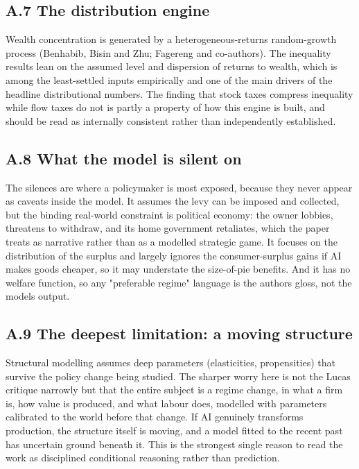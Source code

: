 \documentclass[11pt]{article}
\begin{document}
\hypertarget{a.7-the-distribution-engine}{%
\subsection{A.7 The distribution
engine}\label{a.7-the-distribution-engine}}

Wealth concentration is generated by a heterogeneous-returns
random-growth process (Benhabib, Bisin and Zhu; Fagereng and
co-authors). The inequality results lean on the assumed level and
dispersion of returns to wealth, which is among the least-settled inputs
empirically and one of the main drivers of the headline distributional
numbers. The finding that stock taxes compress inequality while flow
taxes do not is partly a property of how this engine is built, and
should be read as internally consistent rather than independently
established.

\hypertarget{a.8-what-the-model-is-silent-on}{%
\subsection{A.8 What the model is silent
on}\label{a.8-what-the-model-is-silent-on}}

The silences are where a policymaker is most exposed, because they never
appear as caveats inside the model. It assumes the levy can be imposed
and collected, but the binding real-world constraint is political
economy: the owner lobbies, threatens to withdraw, and its home
government retaliates, which the paper treats as narrative rather than
as a modelled strategic game. It focuses on the distribution of the
surplus and largely ignores the consumer-surplus gains if AI makes goods
cheaper, so it may understate the size-of-pie benefits. And it has no
welfare function, so any "preferable regime" language is the
authors\textquotesingle{} gloss, not the model\textquotesingle s output.

\hypertarget{a.9-the-deepest-limitation-a-moving-structure}{%
\subsection{A.9 The deepest limitation: a moving
structure}\label{a.9-the-deepest-limitation-a-moving-structure}}

Structural modelling assumes deep parameters (elasticities,
propensities) that survive the policy change being studied. The sharper
worry here is not the Lucas critique narrowly but that the entire
subject is a regime change, in what a firm is, how value is produced,
and what labour does, modelled with parameters calibrated to the world
before that change. If AI genuinely transforms production, the structure
itself is moving, and a model fitted to the recent past has uncertain
ground beneath it. This is the strongest single reason to read the work
as disciplined conditional reasoning rather than prediction.
\end{document}
